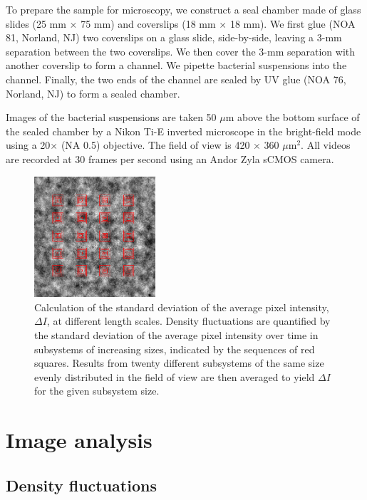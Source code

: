 \documentclass[9pt,twoside,lineno]{pnas-new}
\begin{document}
To prepare the sample for microscopy, we construct a seal chamber made of glass slides (25 mm $\times$ 75 mm) and coverslips (18 mm $\times$ 18 mm). We first glue (NOA 81, Norland, NJ) two coverslips on a glass slide, side-by-side, leaving a 3-mm separation between the two coverslips. We then cover the 3-mm separation with another coverslip to form a channel. We pipette bacterial suspensions into the channel. Finally, the two ends of the channel are sealed by UV glue (NOA 76, Norland, NJ) to form a sealed chamber.

Images of the bacterial suspensions are taken 50 $\mu$m above the bottom surface of the sealed chamber by a Nikon Ti-E inverted microscope in the bright-field mode using a 20$\times$ (NA 0.5) objective. The field of view is 420 $\times$ 360 $\mu$m$^2$. All videos are recorded at 30 frames per second using an Andor Zyla sCMOS camera.

\begin{figure}[h]
	\begin{center}
		\includegraphics[width=0.4\textwidth]{fig-7.pdf}
		\caption[GNF calculations]
		{Calculation of the standard deviation of the average pixel intensity, $\Delta I$, at different length scales. Density fluctuations are quantified by the standard deviation of the average pixel intensity over time in subsystems of increasing sizes, indicated by the sequences of red squares. Results from twenty different subsystems of the same size evenly distributed in the field of view are then averaged to yield $\Delta I$ for the given subsystem size.}
		\label{GNF-calculation}
	\end{center}
\end{figure}

\FloatBarrier

\section{Image analysis} \label{appendix-IA}
\subsection{Density fluctuations} \label{sec:GNF-calculations}
\end{document}
